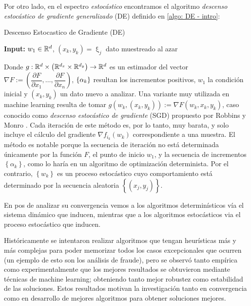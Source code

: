 Por otro lado, en el espectro \textit{estoc\'astico} encontramos el algoritmo \textit{descenso estoc\'astico de gradiente generalizado} (DE) definido en \ref{algo: DE - intro}:

 \LinesNumbered
 \begin{algorithm}[H]
 	\caption{Descenso Estocastico de Gradiente (DE) \label{algo: DE - intro}}
 	\textbf{Input:} $w_1 \in {\mathbb{R}}^d$, $(x_k, y_k) = \upxi_j$ dato muestreado al azar\\
 \end{algorithm}

Donde $g : {\mathbb{R}}^d \times \left( {\mathbb{R}}^{d_x} \times {\mathbb{R}}^{d_y} \right) \rightarrow {\mathbb{R}}^d$ es un estimador del vector $\nabla F := \left(\dfrac{\partial F}{\partial x_1}, \dots, \dfrac{\partial F}{\partial x_n}\right)$, $\left\lbrace\alpha_k\right\rbrace$ resultan los incrementos positivos, $w_1$ la condici\'on inicial y $(x_k, y_k)$ un dato nuevo a analizar. Una variante muy utilizada en machine learning resulta de tomar $g(w_k, \left(x_k, y_k\right)) := \nabla F(w_k, x_k, y_k)$, caso conocido como \textit{descenso estoc\'astico de gradiente} (SGD) propuesto por Robbins y Monro \cite{robbins:1951}. Cada iteraci\'on de este m\'etodo es, por lo tanto, muy barata, y solo incluye el c\'alculo del gradiente $\nabla f_{i_k} (w_k)$ correspondiente a una muestra. El m\'etodo es notable porque la secuencia de iteraci\'on no est\'a determinada \'unicamente por la funci\'on $F$, el punto de inicio $w_1$, y la secuencia de incrementos $\left\lbrace \alpha _k \right\rbrace $, como lo har\'ia en un algoritmo de optimizaci\'on determinista. Por el contrario, $\left\lbrace w_k \right\rbrace $ es un proceso estoc\'astico cuyo comportamiento est\'a determinado por la secuencia aleatoria $\left\lbrace (x_j, y_j) \right\rbrace $.

En pos de analizar su convergencia vemos a los algoritmos determin\'isticos v\'ia el sistema din\'amico que inducen, mientras que a los algoritmos estoc\'asticos via el proceso estoc\'astico que inducen.

Hist\'oricamente se intentaron realizar algoritmos que tengan heur\'isticas m\'as y m\'as complejas para poder memorizar todos los casos excepcionales que ocurren (un ejemplo de esto son los an\'alisis de fraude), pero se observ\'o tanto emp\'irica como experimentalmente que los mejores resultados se obtuvieron mediante t\'ecnicas de machine learning; obteniendo tanto mejor robustez como estabilidad de las soluciones. Estos resultados motivan la investigaci\'on tanto en convergencia como en desarrollo de mejores algoritmos para obtener soluciones mejores.

